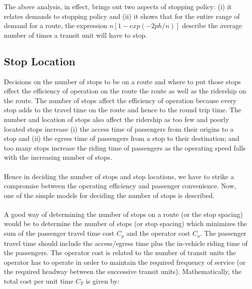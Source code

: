 The above analysis, in effect, brings out two aspects of stopping policy: (i) it relates demands to stopping policy and (ii) it shows that for the entire range of demand for a route, the expression $n[1 - exp(-2ph/n)]$ describe the average number of times a transit unit will have to stop.
\begin{center}
\end{center}
\subsection{Stop Location}
Decisions on the number of stops to be on a route and where to put those stops effect the efficiency of operation on the route the route as well as the ridership on the route. The number of stops affect the efficiency of operation because every stop adds to the travel time on the route and hence to the round trip time. The number and location of stops also affect the ridership as too few and poorly located stops increase (i) the access time of passengers from their origins to a stop and (ii) the egress time of passengers from a stop to their destination; and too many stops increase the riding time of passengers as the operating speed falls with the increasing number of stops.\\\\
Hence in deciding the number of stops and stop locations, we have to strike a compromise between the operating efficiency and passenger convenience. Now, one of the simple models for deciding the number of stops is described.\\\\
A good way of determining the number of stops on a route (or the stop spacing) would be to determine the number of stops (or stop spacing) which minimizes the sum of the passenger travel time cost $C_p$ and the operator cost $C_o$. The passenger travel time should include the access/egress time plus the in-vehicle riding time of the passengers. The operator cost is related to the number of transit units the operator has to operate in order to maintain the required frequency of service (or the required headway between the successive transit units). Mathematically, the total cost per unit time $C_T$ is given by:
